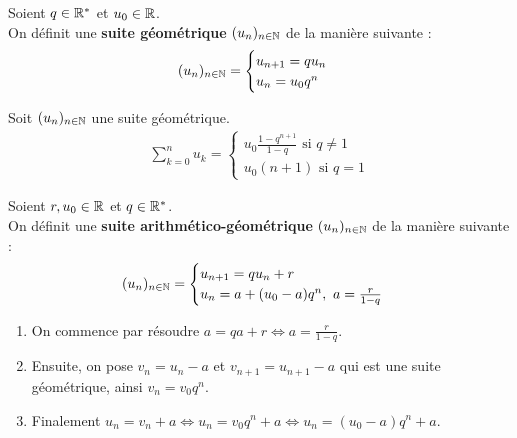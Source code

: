 \begin{definition}
    Soient $q \in \mathbb{R}^*$ et $u_0 \in \mathbb{R}$.
    \\
    On définit une \textbf{suite géométrique} $(u_n)_{n \in \mathbb{N}}$ de la manière suivante : 
    \begin{align*}
        (u_n)_{n \in \mathbb{N}} = 
        \begin{cases}
            u_{n+1} = qu_n \\
            u_n = u_0 q^n
        \end{cases}
    \end{align*}
\end{definition}

\begin{proposition}
    Soit $(u_n)_{n \in \mathbb{N}}$ une suite géométrique.
    \begin{align*}
        \sum_{k = 0}^{n} u_k = 
        \begin{cases}
            u_0 \frac{1 - q^{n+1}}{1 - q} \text{ si } q \neq 1\\
            u_0(n+1) \text{ si } q = 1
        \end{cases}
    \end{align*}
\end{proposition}

\begin{definition}
    Soient $r, u_0 \in \mathbb{R}$ et $q \in \mathbb{R}^*$. 
    \\
    On définit une \textbf{suite arithmético-géométrique} $(u_n)_{n \in \mathbb{N}}$ de la manière suivante :
    \begin{align*}
        (u_n)_{n \in \mathbb{N}} = 
        \begin{cases}
            u_{n+1} = qu_n + r \\ 
            u_n = a + (u_0 - a) q^n,\ a = \frac{r}{1 - q}
        \end{cases}
    \end{align*}
\end{definition}

\begin{enumerate}
	\item On commence par résoudre $a = qa + r \iff a = \frac{r}{1 - q}$.
	\item Ensuite, on pose $v_n = u_n - a$ et $v_{n+1} = u_{n+1} - a$ qui est une suite géométrique, ainsi $v_n = v_0 q^n$.
	\item Finalement $u_n = v_n + a \iff u_n = v_0 q^n + a \iff u_n = (u_0 - a) q^n + a$.
\end{enumerate}

